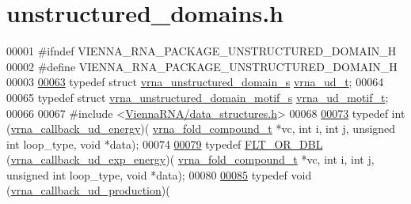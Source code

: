 \hypertarget{unstructured__domains_8h_source}{}\section{unstructured\+\_\+domains.\+h}
\label{unstructured__domains_8h_source}

\begin{DoxyCode}
00001 \textcolor{preprocessor}{#ifndef VIENNA\_RNA\_PACKAGE\_UNSTRUCTURED\_DOMAIN\_H}
00002 \textcolor{preprocessor}{#define VIENNA\_RNA\_PACKAGE\_UNSTRUCTURED\_DOMAIN\_H}
00003 
\hypertarget{unstructured__domains_8h_source.tex_l00063}{}\hyperlink{group__domains__up_ga0009117b14d29143e8b18ab891f48c2d}{00063} \textcolor{keyword}{typedef} \textcolor{keyword}{struct }\hyperlink{group__domains__up_structvrna__unstructured__domain__s}{vrna\_unstructured\_domain\_s}  \hyperlink{group__domains__up_structvrna__unstructured__domain__s}{vrna\_ud\_t};
00064 
00065 \textcolor{keyword}{typedef} \textcolor{keyword}{struct }\hyperlink{structvrna__unstructured__domain__motif__s}{vrna\_unstructured\_domain\_motif\_s}  
      \hyperlink{structvrna__unstructured__domain__motif__s}{vrna\_ud\_motif\_t};
00066 
00067 \textcolor{preprocessor}{#include <\hyperlink{data__structures_8h}{ViennaRNA/data\_structures.h}>}
00068 
\hypertarget{unstructured__domains_8h_source.tex_l00073}{}\hyperlink{group__domains__up_ga60a2244cf1415fd076cc0dba92c2a96d}{00073} \textcolor{keyword}{typedef} int (\hyperlink{group__domains__up_ga60a2244cf1415fd076cc0dba92c2a96d}{vrna\_callback\_ud\_energy})(
      \hyperlink{group__fold__compound_structvrna__fc__s}{vrna\_fold\_compound\_t} *vc, \textcolor{keywordtype}{int} i, \textcolor{keywordtype}{int} j, \textcolor{keywordtype}{unsigned} \textcolor{keywordtype}{int} loop\_type, \textcolor{keywordtype}{void} *data);
00074 
\hypertarget{unstructured__domains_8h_source.tex_l00079}{}\hyperlink{group__domains__up_ga79eb0224b0b6e0a86c9e8c4a1b0cad04}{00079} \textcolor{keyword}{typedef} \hyperlink{group__data__structures_ga31125aeace516926bf7f251f759b6126}{FLT\_OR\_DBL} (\hyperlink{group__domains__up_ga79eb0224b0b6e0a86c9e8c4a1b0cad04}{vrna\_callback\_ud\_exp\_energy})(
      \hyperlink{group__fold__compound_structvrna__fc__s}{vrna\_fold\_compound\_t} *vc, \textcolor{keywordtype}{int} i, \textcolor{keywordtype}{int} j, \textcolor{keywordtype}{unsigned} \textcolor{keywordtype}{int} loop\_type, \textcolor{keywordtype}{void} *data);
00080 
\hypertarget{unstructured__domains_8h_source.tex_l00085}{}\hyperlink{group__domains__up_ga5cb14c4f2149c3df9842a709d6d64140}{00085} \textcolor{keyword}{typedef} void (\hyperlink{group__domains__up_ga5cb14c4f2149c3df9842a709d6d64140}{vrna\_callback\_ud\_production})(

\end{DoxyCode}
